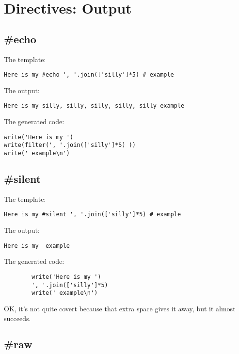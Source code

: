 \section{Directives: Output}
\label{output}

\subsection{\#echo}
\label{output.echo}

The template:
\begin{verbatim}
Here is my #echo ', '.join(['silly']*5) # example
\end{verbatim}

The output:
\begin{verbatim}
Here is my silly, silly, silly, silly, silly example
\end{verbatim}

The generated code:
\begin{verbatim}
write('Here is my ')
write(filter(', '.join(['silly']*5) ))
write(' example\n')
\end{verbatim}

\subsection{\#silent}
\label{output.silent}

The template:
\begin{verbatim}
Here is my #silent ', '.join(['silly']*5) # example
\end{verbatim}

The output:
\begin{verbatim}
Here is my  example
\end{verbatim}

The generated code:
\begin{verbatim}
        write('Here is my ')
        ', '.join(['silly']*5) 
        write(' example\n')
\end{verbatim}

OK, it's not quite covert because that extra space gives it away, but it 
almost succeeds.


\subsection{\#raw}
\label{output.raw}

